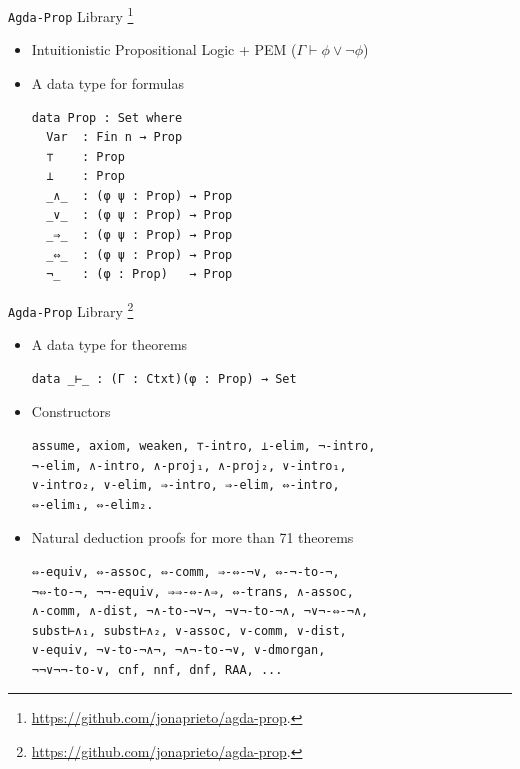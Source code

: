 \documentclass[10pt, xetex, hyperref={pdfpagelabels=false}]{beamer}
\begin{document}
\begin{frame}[fragile, label=agda-prop-2]{\texttt{Agda-Prop} Library
  \footnote{\url{https://github.com/jonaprieto/agda-prop}.}}
\begin{itemize}
  \item Intuitionistic Propositional Logic + PEM ($Γ ⊢ ϕ ∨ ¬ ϕ$)
  \item A data type for formulas
  \vspace*{1mm}

\begin{verbatim}
data Prop : Set where
  Var  : Fin n → Prop
  ⊤    : Prop
  ⊥    : Prop
  _∧_  : (φ ψ : Prop) → Prop
  _∨_  : (φ ψ : Prop) → Prop
  _⇒_  : (φ ψ : Prop) → Prop
  _⇔_  : (φ ψ : Prop) → Prop
  ¬_   : (φ : Prop)   → Prop
\end{verbatim}
\end{itemize}
\end{frame}

\begin{frame}[fragile, label=agda-prop]{\texttt{Agda-Prop} Library
  \footnote{\url{https://github.com/jonaprieto/agda-prop}.}}
\begin{itemize}
  \item A data type for theorems
  \vspace*{1mm}
\begin{verbatim}
data _⊢_ : (Γ : Ctxt)(φ : Prop) → Set
\end{verbatim}

\item Constructors
  \vspace*{1mm}

\begin{verbatim}
assume, axiom, weaken, ⊤-intro, ⊥-elim, ¬-intro,
¬-elim, ∧-intro, ∧-proj₁, ∧-proj₂, ∨-intro₁,
∨-intro₂, ∨-elim, ⇒-intro, ⇒-elim, ⇔-intro,
⇔-elim₁, ⇔-elim₂.
\end{verbatim}
  \item Natural deduction proofs for more than 71 theorems
  \vspace*{1mm}
\begin{verbatim}
⇔-equiv, ⇔-assoc, ⇔-comm, ⇒-⇔-¬∨, ⇔-¬-to-¬,
¬⇔-to-¬, ¬¬-equiv, ⇒⇒-⇔-∧⇒, ⇔-trans, ∧-assoc,
∧-comm, ∧-dist, ¬∧-to-¬∨¬, ¬∨¬-to-¬∧, ¬∨¬-⇔-¬∧,
subst⊢∧₁, subst⊢∧₂, ∨-assoc, ∨-comm, ∨-dist,
∨-equiv, ¬∨-to-¬∧¬, ¬∧¬-to-¬∨, ∨-dmorgan,
¬¬∨¬¬-to-∨, cnf, nnf, dnf, RAA, ...
\end{verbatim}
\end{itemize}
\end{frame}
\end{document}
